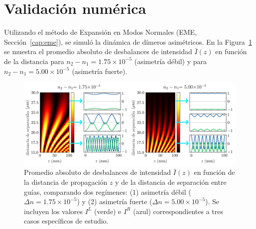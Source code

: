 \section{Validación numérica}

Utilizando el método de Expansión en Modos Normales (EME, Sección~\ref{cap:eme}), se simuló la dinámica de dímeros asimétricos. En la Figura~\ref{fig:nonotrho-num} se muestra el promedio absoluto de desbalances de intensidad $\bar{I}(z)$ en función de la distancia para $n_2 - n_1 = 1.75 \times 10^{-5}$ (asimetría débil) y para $n_2 - n_1 = 5.00 \times 10^{-5}$ (asimetría fuerte).

\begin{figure}[H]
	\centering
	\includegraphics[width=\linewidth]{media/imbalance-nonortho.png}
	\caption[Promedio absoluto de desbalances de intensidad $\bar{I}(z)$ en función de la distancia de propagación $z$]{Promedio absoluto de desbalances de intensidad $\bar{I}(z)$ en función de la distancia de propagación $z$ y de la distancia de separación entre guías, comparando dos regímenes: (1) asimetría débil ($\Delta n = 1.75 \times 10^{-5}$) y (2) asimetría fuerte ($\Delta n = 5.00 \times 10^{-5}$). Se incluyen los valores $I^L$ (verde) e $I^R$ (azul) correspondientes a tres casos específicos de estudio.}
	\label{fig:nonotrho-num}
\end{figure}

